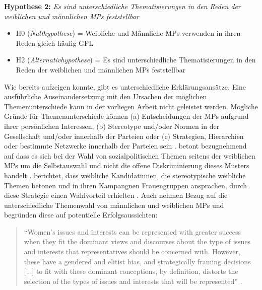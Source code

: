 \documentclass[12pt, 
    twoside=false, 
    bibliography=totoc, 
    numbers=endperiod, 
    headings=normal, 
    toc=chapterentrydotfill
    ]{scrbook}
\begin{document}
\textbf{Hypothese 2:} \emph{Es sind unterschiedliche Thematisierungen in den Reden der weiblichen und männlichen MPs feststellbar}

\begin{itemize}
    \item H0 (\emph{Nullhypothese}) = Weibliche und Männliche MPs verwenden in ihren Reden gleich häufig GFL 
    \item H2 (\emph{Alternativhypothese}) = Es sind unterschiedliche Thematisierungen in den Reden der weiblichen und männlichen MPs feststellbar
    
\end{itemize}{}

Wie \textcite{back_2014} bereits aufzeigen konnte, gibt es unterschiedliche Erklärungsansätze. Eine ausführliche Auseinandersetzung mit den Ursachen der möglichen Themenunterschiede kann in der vorliegen Arbeit nicht geleistet werden. Mögliche Gründe für Themenunterschiede können (a) Entscheidungen der MPs aufgrund ihrer persönlichen Interessen, (b) Stereotype und/oder Normen in der Gesellschaft und/oder innerhalb der Parteien oder (c) Strategien, Hierarchien oder bestimmte Netzwerke innerhalb der Parteien sein \parencites[507]{back_2014}. \textcite [250]{ennser-jedenastik_2017} betont bezugnehmend auf \textcites{baekgaard_2012}{thomas_1994} dass es sich bei der Wahl von sozialpolitischen Themen seitens der weiblichen MPs um die Selbstauswahl und nicht die offene Diskriminierung dieses Musters handelt \parencite[250]{ennser-jedenastik_2017}. \textcite{herrnson_2003} berichtet, dass weibliche Kandidatinnen, die stereotypische weibliche Themen betonen und in ihren Kampangnen Frauengruppen ansprachen, durch diese Strategie einen Wahlvorteil erhielten \parencite[250]{ennser-jedenastik_2017}. Auch \textcite{celis_2018} nehmen Bezug auf die unterschiedliche Themenwahl von männlichen und weiblichen MPs und begründen diese auf potentielle Erfolgsaussichten:


\citereset
\begin{quote}
    \enquote{Women’s issues and interests can be represented with greater success when they fit the dominant views and discourses about the type of issues and interests that representatives should be concerned with. However, these have a gendered and elitist bias, and strategically framing decisions [...] to fit with these dominant conceptions, by definition, distorts the selection of the types of issues and interests that will be represented} \parencite[151]{celis_2018}.
\end{quote}
\end{document}

